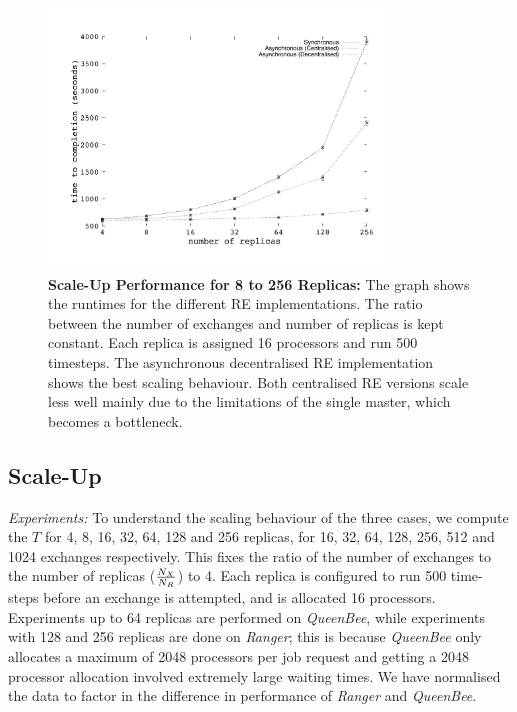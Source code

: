 \documentclass{rspublic}
\newcommand{\alnote}[1]{ {\textcolor{blue} { ***andre: #1 }}}
\newcommand{\athotanote}[1]{ {\textcolor{green} { ***athota: #1 }}}
\newcommand{\alnote}[1]{}
\newcommand{\athotanote}[1]{}
\begin{document}
%
\begin{figure}
\centering
\includegraphics[width=0.8\textwidth]{../data/scale_up.pdf}
\caption{\small \textbf{Scale-Up Performance for 8 to 256 Replicas:}
  The graph shows the runtimes for the different RE implementations.
  The ratio between the number of exchanges and number of replicas is
  kept constant. Each replica is assigned 16 processors and run 500
  timesteps.  The asynchronous decentralised RE implementation shows
  the best scaling behaviour. Both centralised RE versions scale less
  well mainly due to the limitations of the single master, which
  becomes a
  bottleneck.}%
\label{fig:scaleup}
\vspace{-1em}
\end{figure}


\subsection{Scale-Up}


{\it Experiments: } To understand the scaling behaviour of the three
cases, we compute the $T$ for 4, 8, 16, 32, 64, 128 and 256 replicas,
for 16, 32, 64, 128, 256, 512 and 1024 exchanges respectively. This
fixes the ratio of the number of exchanges to the number of replicas
($N_X \over N_R$) to 4.  Each replica is configured to run 500 time-steps
before an exchange is attempted, and is allocated 16
processors. Experiments up to 64 replicas are performed on {\it
  QueenBee}, while experiments with 128 and 256 replicas are done on
\emph{Ranger}; this is because \emph{QueenBee} only allocates a
maximum of 2048 processors per job request and getting a 2048 processor allocation involved extremely large waiting times. We have normalised the data to factor in the difference in performance of {\it Ranger} and {\it QueenBee}.
\end{document}
